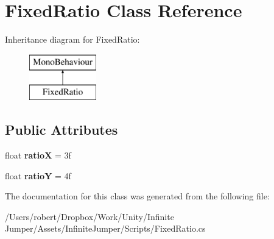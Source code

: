 \hypertarget{class_fixed_ratio}{}\section{Fixed\+Ratio Class Reference}
\label{class_fixed_ratio}
Inheritance diagram for Fixed\+Ratio\+:\begin{figure}[H]
\begin{center}
\leavevmode
\includegraphics[height=2.000000cm]{class_fixed_ratio}
\end{center}
\end{figure}
\subsection*{Public Attributes}
\begin{DoxyCompactItemize}
\item 
\hypertarget{class_fixed_ratio_a4d1f4a1da9ca7a9a1157c97e0bd24654}{}float {\bfseries ratio\+X} = 3f\label{class_fixed_ratio_a4d1f4a1da9ca7a9a1157c97e0bd24654}

\item 
\hypertarget{class_fixed_ratio_a3f5bd1c44a5a526075cf9cf1be56c3e4}{}float {\bfseries ratio\+Y} = 4f\label{class_fixed_ratio_a3f5bd1c44a5a526075cf9cf1be56c3e4}

\end{DoxyCompactItemize}


The documentation for this class was generated from the following file\+:\begin{DoxyCompactItemize}
\item 
/\+Users/robert/\+Dropbox/\+Work/\+Unity/\+Infinite Jumper/\+Assets/\+Infinite\+Jumper/\+Scripts/Fixed\+Ratio.\+cs\end{DoxyCompactItemize}
